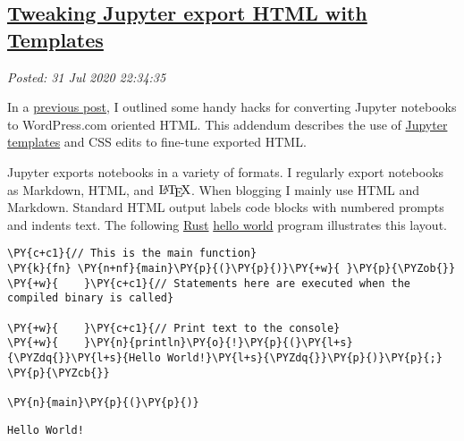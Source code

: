 %

\subsection*{\href{http://analyzethedatanotthedrivel.org/2020/07/31/tweaking-jupyter-export-html-with-templates/}{Tweaking Jupyter export HTML with Templates}}


\noindent\emph{Posted: 31 Jul 2020 22:34:35}
\vspace{6pt}
    
    
    In a
\href{https://analyzethedatanotthedrivel.org/2020/06/01/better-blogging-with-jupyter-notebooks-on-wordpress-com/}{previous
post}, I outlined some handy hacks for converting Jupyter notebooks to
WordPress.com oriented HTML. This addendum describes the use of
\href{https://www.datacamp.com/community/tutorials/jinja2-custom-export-templates-jupyter}{Jupyter
templates} and CSS edits to fine-tune exported HTML.

Jupyter exports notebooks in a variety of formats. I regularly export
notebooks as Markdown, HTML, and \(\LaTeX\). When blogging I mainly use
HTML and Markdown. Standard HTML output labels code blocks with numbered
prompts and indents text. The following
\href{https://www.rust-lang.org/}{Rust}
\href{https://en.wikipedia.org/wiki/\%22Hello,_World!\%22_program}{hello
world} program illustrates this layout.

    \begin{tcolorbox}[breakable, size=fbox, boxrule=1pt, pad at break*=1mm,colback=cellbackground, colframe=cellborder]
\begin{Verbatim}[commandchars=\\\{\}]
\PY{c+c1}{// This is the main function}
\PY{k}{fn} \PY{n+nf}{main}\PY{p}{(}\PY{p}{)}\PY{+w}{ }\PY{p}{\PYZob{}}
\PY{+w}{    }\PY{c+c1}{// Statements here are executed when the compiled binary is called}

\PY{+w}{    }\PY{c+c1}{// Print text to the console}
\PY{+w}{    }\PY{n}{println}\PY{o}{!}\PY{p}{(}\PY{l+s}{\PYZdq{}}\PY{l+s}{Hello World!}\PY{l+s}{\PYZdq{}}\PY{p}{)}\PY{p}{;}
\PY{p}{\PYZcb{}}

\PY{n}{main}\PY{p}{(}\PY{p}{)}
\end{Verbatim}
\end{tcolorbox}

    \begin{Verbatim}[commandchars=\\\{\}]
Hello World!
    \end{Verbatim}

